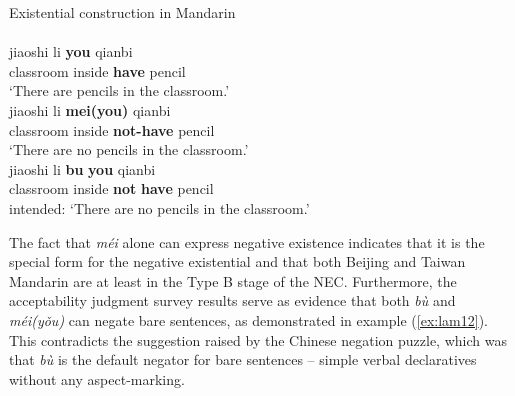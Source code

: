 \documentclass[output=paper]{langscibook}
\begin{document}
\ea Existential construction in Mandarin \label{ex:lam11}\\
   \label{ex:lam11a}\\
  	\gll jiaoshi	 li	\textbf{you} qianbi\\ 
  	classroom	inside	\textbf{have}	pencil\\
  	\glt `There are pencils in the classroom.'
   \label{ex:lam11b}\\
  	\gll jiaoshi	 li \textbf{mei(you)} qianbi\\
  	classroom inside \textbf{not-have} pencil\\
  	\glt `There are no pencils in the classroom.'
   \label{ex:lam11c}\\
  	\gll *jiaoshi li \textbf{bu} \textbf{you} qianbi\\		
  	classroom	inside	\textbf{not} \textbf{have}	pencil\\
  	\glt intended: `There are no pencils in the classroom.'
\z \z 


The fact that \textit{méi} alone can express negative existence indicates that it is the special form for the negative existential and that both Beijing and Taiwan Mandarin are at least in the Type B stage of the NEC. Furthermore, the acceptability judgment survey results serve as evidence that both \textit{bù} and \textit{méi(yǒu)} can negate bare sentences, as demonstrated in example (\ref{ex:lam12}). This contradicts the suggestion raised by the Chinese negation puzzle, which was that \textit{bù} is the default negator for bare sentences – simple verbal declaratives without any aspect-marking.


\end{document}
